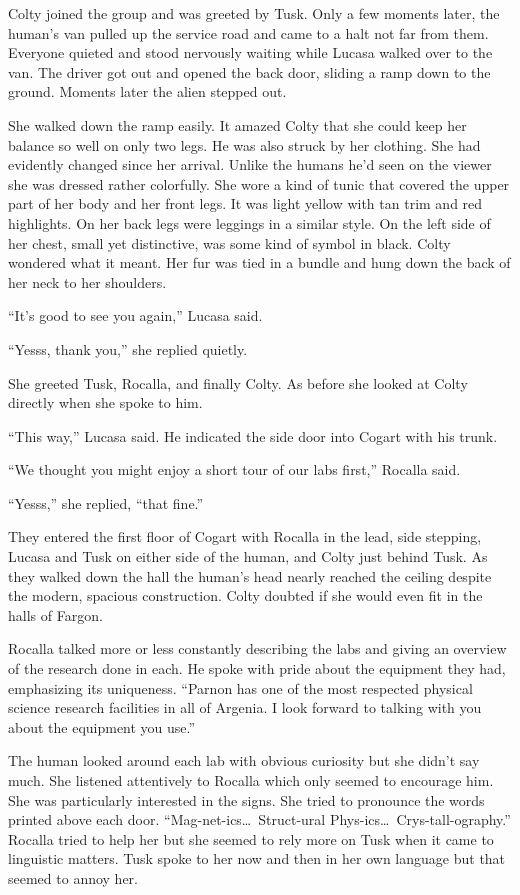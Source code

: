 Colty joined the group and was greeted by Tusk. Only a few moments later, the human's van pulled
up the service road and came to a halt not far from them. Everyone quieted and stood nervously
waiting while Lucasa walked over to the van. The driver got out and opened the back door,
sliding a ramp down to the ground. Moments later the alien stepped out.

She walked down the ramp easily. It amazed Colty that she could keep her balance so well on only
two legs. He was also struck by her clothing. She had evidently changed since her arrival.
Unlike the humans he'd seen on the viewer she was dressed rather colorfully. She wore a kind of
tunic that covered the upper part of her body and her front legs. It was light yellow with tan
trim and red highlights. On her back legs were leggings in a similar style. On the left side of
her chest, small yet distinctive, was some kind of symbol in black. Colty wondered what it
meant. Her fur was tied in a bundle and hung down the back of her neck to her shoulders.

``It's good to see you again,'' Lucasa said.

``Yesss, thank you,'' she replied quietly.

She greeted Tusk, Rocalla, and finally Colty. As before she looked at Colty directly when she
spoke to him.

``This way,'' Lucasa said. He indicated the side door into Cogart with his trunk.

``We thought you might enjoy a short tour of our labs first,'' Rocalla said.

``Yesss,'' she replied, ``that fine.''

They entered the first floor of Cogart with Rocalla in the lead, side stepping, Lucasa and Tusk
on either side of the human, and Colty just behind Tusk. As they walked down the hall the
human's head nearly reached the ceiling despite the modern, spacious construction. Colty
doubted if she would even fit in the halls of Fargon.

Rocalla talked more or less constantly describing the labs and giving an overview of the
research done in each. He spoke with pride about the equipment they had, emphasizing its
uniqueness. ``Parnon has one of the most respected physical science research facilities in all
of Argenia. I look forward to talking with you about the equipment you use.''

The human looked around each lab with obvious curiosity but she didn't say much. She listened
attentively to Rocalla which only seemed to encourage him. She was particularly interested in
the signs. She tried to pronounce the words printed above each door. ``Mag-net-ics\ldots\
Struct-ural Phys-ics\ldots\ Crys-tall-ography.'' Rocalla tried to help her but she seemed to
rely more on Tusk when it came to linguistic matters. Tusk spoke to her now and then in her own
language but that seemed to annoy her.

